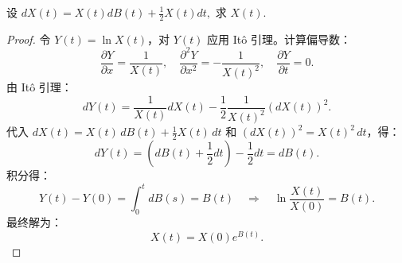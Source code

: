 \documentclass[lang=cn,10pt,thmcnt=section]{elegantbook}
\begin{document}
\begin{example}
	设 \( dX(t) = X(t) dB(t) + \frac{1}{2} X(t) dt, \) 求 \( X(t) \).
\end{example}
\begin{proof}
	令 \( Y(t) = \ln X(t) \)，对 \( Y(t) \) 应用 Itô 引理。计算偏导数：
\[
\frac{\partial Y}{\partial x} = \frac{1}{X(t)}, \quad 
\frac{\partial^2 Y}{\partial x^2} = -\frac{1}{X(t)^2}, \quad 
\frac{\partial Y}{\partial t} = 0.
\]
由 Itô 引理：
\[
dY(t) = \frac{1}{X(t)} dX(t) - \frac{1}{2} \frac{1}{X(t)^2} (dX(t))^2.
\]
代入 \( dX(t) = X(t)\, dB(t) + \frac{1}{2}X(t)\, dt \) 和 \( (dX(t))^2 = X(t)^2\, dt \)，得：
\[
dY(t) = \left( dB(t) + \frac{1}{2}dt \right) - \frac{1}{2}dt = dB(t).
\]
积分得：
\[
Y(t) - Y(0) = \int_0^t dB(s) = B(t) \quad \Rightarrow \quad \ln \frac{X(t)}{X(0)} = B(t).
\]
最终解为：
\[
X(t) = X(0) e^{B(t)}.
\]
\end{proof}
\end{document}

